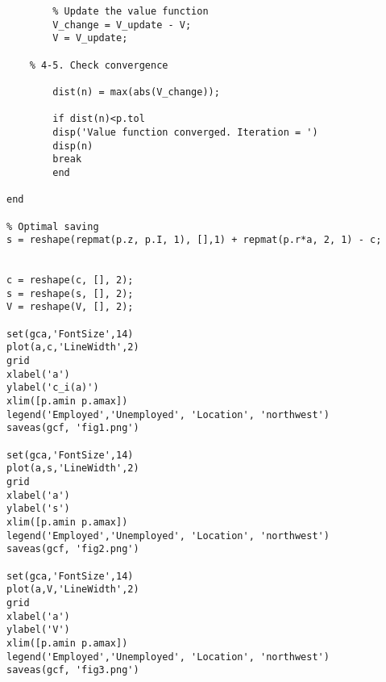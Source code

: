 \begin{lstlisting}
        % Update the value function
        V_change = V_update - V;
        V = V_update;

    % 4-5. Check convergence
          
        dist(n) = max(abs(V_change));

        if dist(n)<p.tol
        disp('Value function converged. Iteration = ')
        disp(n)
        break
        end

end

% Optimal saving
s = reshape(repmat(p.z, p.I, 1), [],1) + repmat(p.r*a, 2, 1) - c;


c = reshape(c, [], 2);
s = reshape(s, [], 2);
V = reshape(V, [], 2);

set(gca,'FontSize',14)
plot(a,c,'LineWidth',2)
grid
xlabel('a')
ylabel('c_i(a)')
xlim([p.amin p.amax])
legend('Employed','Unemployed', 'Location', 'northwest')
saveas(gcf, 'fig1.png')

set(gca,'FontSize',14)
plot(a,s,'LineWidth',2)
grid
xlabel('a')
ylabel('s')
xlim([p.amin p.amax])
legend('Employed','Unemployed', 'Location', 'northwest')
saveas(gcf, 'fig2.png')

set(gca,'FontSize',14)
plot(a,V,'LineWidth',2)
grid
xlabel('a')
ylabel('V')
xlim([p.amin p.amax])
legend('Employed','Unemployed', 'Location', 'northwest')
saveas(gcf, 'fig3.png')

\end{lstlisting}


